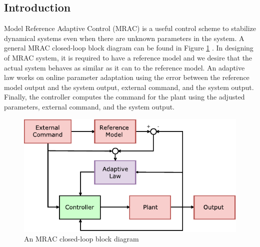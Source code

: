 \subsection{Introduction}
Model Reference Adaptive Control (MRAC) is a useful control scheme to stabilize dynamical systems even when there are unknown parameters in the system. A general MRAC closed-loop block diagram can be found in Figure \ref{MRAC_blockdiagram} \cite{Lavretsky2013}. In designing of MRAC system, it is required to have a reference model and we desire that the actual system behaves as similar as it can to the reference model. An adaptive law works on online parameter adaptation using the error between the reference model output and the system output, external command, and the system output. Finally, the controller computes the command for the plant using the adjusted parameters, external command, and the system output. 
\begin{figure}[htbp]
	\centering
	\includegraphics[width = 5in]{images/chapter2/MRAC.pdf}
	\caption{An MRAC closed-loop block diagram}
	\label{MRAC_blockdiagram}
\end{figure}
